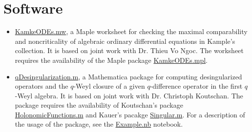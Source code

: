 \documentclass[a4paper,12pt]{article}
\begin{document}
\section*{\Large{Software}}
\begin{itemize}
  \item \href{https://yzhang1616.github.io/KamkeODEs.mw}{KamkeODEs.mw}, a Maple worksheet for 
     checking the maximal comparability and noncriticality of algebraic
     ordinary differential equations in
     Kample's collection. It is based on joint work with Dr. Thieu Vo Ngoc. 
     The worksheet requires the availability of the Maple package \href{https://yzhang1616.github.io/KamkeODEs.mpl}{KamkeODEs.mpl}.
 \item \href{https://yzhang1616.github.io/qDesingularization.m}{qDesingularization.m}, a Mathematica
     package for computing desingularized operators and the $q$-Weyl closure of
     a given $q$-difference operator in
     the first $q$-Weyl algebra. It is based on joint work with Dr. Christoph
     Koutschan. The package requires the availability of Koutschan's package
     \href{http://www.risc.jku.at/research/combinat/software/ergosum/RISC/HolonomicFunctions.html}{HolonomicFunctions.m}
     and Kauer's pacakge \href{https://www.risc.jku.at/research/combinat/risc/software/Singular/index.html}{Singular.m}.
     For a description of the usage of the package, see the \href{https://yzhang1616.github.io/Example.nb}{Example.nb} notebook.
\end{itemize}
\end{document}
